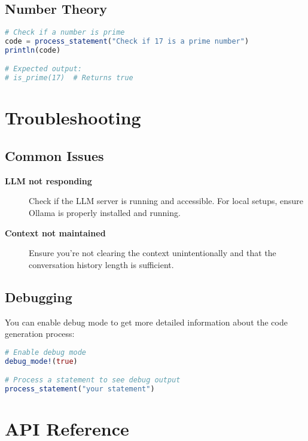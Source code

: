 \documentclass[11pt,a4paper]{article}
\newcommand{\important}[1]{\textbf{#1}}
\providecommand{\important}[1]{\textbf{\color{red!70!black}#1}}
\begin{document}
\subsection{Number Theory}

\begin{lstlisting}[language=Julia]
# Check if a number is prime
code = process_statement("Check if 17 is a prime number")
println(code)

# Expected output:
# is_prime(17)  # Returns true
\end{lstlisting}

\section{Troubleshooting}
\label{sec:troubleshooting}

\subsection{Common Issues}

\begin{description}
    \item[\important{LLM not responding}] Check if the LLM server is running and accessible. For local setups, ensure Ollama is properly installed and running.
    
    \item[\important{Context not maintained}] Ensure you're not clearing the context unintentionally and that the conversation history length is sufficient.
\end{description}

\subsection{Debugging}

You can enable debug mode to get more detailed information about the code generation process:

\begin{lstlisting}[language=Julia]
# Enable debug mode
debug_mode!(true)

# Process a statement to see debug output
process_statement("your statement")
\end{lstlisting}

\section{API Reference}
\label{sec:api_reference}
\end{document}
